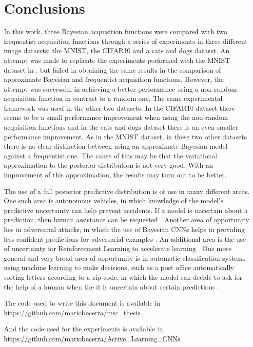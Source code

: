 
\chapter{Conclusions}
\label{ch:conclusions}


In this work, three Bayesian acquisition functions were compared with two frequentist acquisition functions through a series of experiments in three different image datasets: the MNIST, the CIFAR10 and a cats and dogs dataset. An attempt was made to replicate the experiments performed with the MNIST dataset in \cite{Gal2016Active}, but failed in obtaining the same results in the comparison of approximate Bayesian and frequentist acquisition functions. However, the attempt was successful in achieving a better performance using a non-random acquisition function in contrast to a random one. The same experimental framework was used in the other two datasets. In the CIFAR10 dataset there seems to be a small performance improvement when using the non-random acquisition functions and in the cats and dogs dataset there is an even smaller performance improvement. As in the MNIST dataset, in these two other datasets there is no clear distinction between using an approximate Bayesian model against a frequentist one. The cause of this may be that the variational approximation to the posterior distribution is not very good. With an improvement of this approximation, the results may turn out to be better.

The use of a full posterior predictive distribution is of use in many different areas. One such area is autonomous vehicles, in which knowledge of the model's predictive uncertainty can help prevent accidents. If a model is uncertain about a prediction, then human assistance can be requested \cite{gal2016uncertainty, kendall2017uncertainties, michelmore2018evaluating}. Another area of opportunity lies in adversarial attacks, in which the use of Bayesian CNNs helps in providing less confident predictions for adversarial examples \cite{li2017dropout, rawat2017adversarial, smith2018understanding}. An additional area is the use of uncertainty for Reinforcement Learning to accelerate learning \cite{gal2016uncertainty}. One more general and very broad area of opportunity is in automatic classification systems using machine learning to make decisions, such as a post office automatically sorting letters according to a zip code, in which the model can decide to ask for the help of a human when the it is uncertain about certain predictions \cite{gal2016uncertainty}.

The code used to write this document is available in \url{https://github.com/mariobecerra/msc_thesis}.

And the code used for the experiments is available in \url{https://github.com/mariobecerra/Active_Learning_CNNs}.
